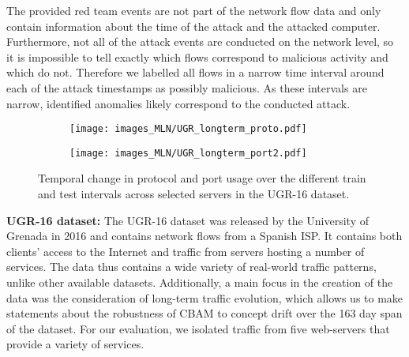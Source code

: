 The provided red team events are not part of the network flow data and only contain information about the time of the attack and the attacked computer. Furthermore, not all of the attack events are conducted on the network level, so it is impossible to tell exactly which flows  correspond to malicious activity and which do not. Therefore we labelled all flows in a narrow time interval around each of the attack timestamps as possibly malicious. As these intervals are narrow, identified anomalies likely correspond to the conducted attack. %


\begin{figure}[ht]
\centering
\vspace{-0.2cm}
    \begin{subfigure}[b]{0.45\textwidth}
        \texttt{[image: images\_MLN/UGR\_longterm\_proto.pdf]}
        \vspace{-0.15cm}
    \end{subfigure}
    \begin{subfigure}[b]{0.45\textwidth}
        \texttt{[image: images\_MLN/UGR\_longterm\_port2.pdf]}
    \end{subfigure}
\caption{Temporal change in protocol and port usage over the different train and test intervals across selected servers in the UGR-16 dataset.}
\label{fig:longterm_analysis}
\end{figure}

\textbf{UGR-16 dataset:}
The UGR-16 dataset \cite{macia2018ugr} was released by the University of Grenada in 2016 and contains network flows from a Spanish ISP. It contains both clients' access to the Internet and traffic from servers hosting a number of services. The data thus contains a wide variety of real-world traffic patterns, unlike other available datasets. %
Additionally, a main focus in the creation of the data was the consideration of long-term traffic evolution, which allows us to make statements about the robustness of CBAM to concept drift over the 163 day span of the dataset. For our evaluation, we isolated traffic from five web-servers that provide a variety of services.



